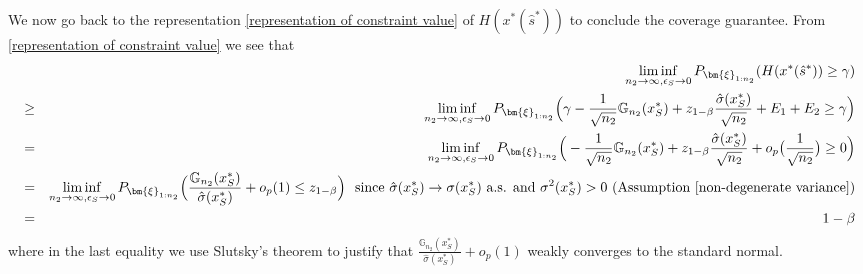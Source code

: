 \documentclass[mnsc,blindrev]{informs4} %
\begin{document}
We now go back to the representation \eqref{representation of constraint value} of $H(x^*(\hat s^*))$ to conclude the coverage guarantee. From \eqref{representation of constraint value} we see that
\begin{eqnarray*}
&&\liminf_{n_2\to\infty,\epsilon_S\to 0}P_{\bm{\xi}_{1:n_2}}(H(x^*(\hat s^*))\geq \gamma)\\
&\geq &\liminf_{n_2\to\infty,\epsilon_S\to 0}P_{\bm{\xi}_{1:n_2}}\Big(\gamma-\frac{1}{\sqrt{n_2}}\mathbb G_{n_2}(x_S^*)+z_{1-\beta}\frac{\hat \sigma (x_S^*)}{\sqrt{n_2}}+E_1+E_2\geq \gamma\Big)\\
&= &\liminf_{n_2\to\infty,\epsilon_S\to 0}P_{\bm{\xi}_{1:n_2}}\Big(-\frac{1}{\sqrt{n_2}}\mathbb G_{n_2}(x_S^*)+z_{1-\beta}\frac{\hat \sigma (x_S^*)}{\sqrt{n_2}}+o_p\big(\frac{1}{\sqrt{n_2}}\big)\geq 0\Big)\\
&= &\liminf_{n_2\to\infty,\epsilon_S\to 0}P_{\bm{\xi}_{1:n_2}}\Big(\frac{\mathbb G_{n_2}(x_S^*)}{\hat \sigma (x_S^*)}+o_p(1)\leq z_{1-\beta}\Big)\text{\ \ since }\hat \sigma (x_S^*)\to \sigma (x_S^*)\text{ a.s. and }\sigma^2 (x_S^*)>0\text{ (Assumption \ref{non-degenerate variance})}\\
&=&1-\beta
\end{eqnarray*}
where in the last equality we use Slutsky's theorem to justify that $\frac{\mathbb G_{n_2}(x_S^*)}{\hat \sigma (x_S^*)}+o_p(1)$ weakly converges to the standard normal.\hfill\Halmos
\end{document}
